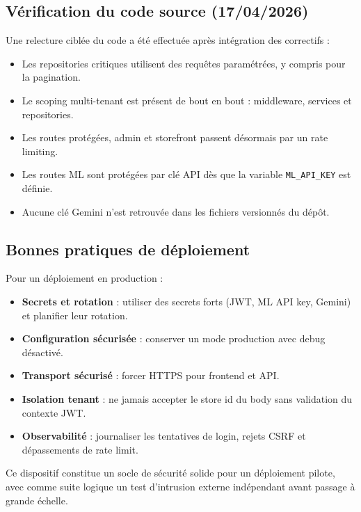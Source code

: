 \documentclass[12pt,a4paper]{report}
\begin{document}
\subsection{V\'{e}rification du code source (17/04/2026)}

Une relecture cibl\'{e}e du code a \'{e}t\'{e} effectu\'{e}e apr\`{e}s int\'{e}gration des correctifs :

\begin{itemize}
  \item Les repositories critiques utilisent des requ\^{e}tes param\'{e}tr\'{e}es, y compris pour la pagination.
  \item Le scoping multi-tenant est pr\'{e}sent de bout en bout : middleware, services et repositories.
  \item Les routes prot\'{e}g\'{e}es, admin et storefront passent d\'{e}sormais par un rate limiting.
  \item Les routes ML sont prot\'{e}g\'{e}es par cl\'{e} API d\`{e}s que la variable \texttt{ML\_API\_KEY} est d\'{e}finie.
  \item Aucune cl\'{e} Gemini n'est retrouv\'{e}e dans les fichiers versionn\'{e}s du d\'{e}p\^{o}t.
\end{itemize}

\subsection{Bonnes pratiques de d\'{e}ploiement}

Pour un d\'{e}ploiement en production :

\begin{itemize}
  \item \textbf{Secrets et rotation} : utiliser des secrets forts (JWT, ML API key, Gemini) et planifier leur rotation.
  \item \textbf{Configuration s\'{e}curis\'{e}e} : conserver un mode production avec debug d\'{e}sactiv\'{e}.
  \item \textbf{Transport s\'{e}curis\'{e}} : forcer HTTPS pour frontend et API.
  \item \textbf{Isolation tenant} : ne jamais accepter le store id du body sans validation du contexte JWT.
  \item \textbf{Observabilit\'{e}} : journaliser les tentatives de login, rejets CSRF et d\'{e}passements de rate limit.
\end{itemize}

Ce dispositif constitue un socle de s\'{e}curit\'{e} solide pour un d\'{e}ploiement pilote, avec comme suite logique un test d'intrusion externe ind\'{e}pendant avant passage \`{a} grande \'{e}chelle.
\end{document}
